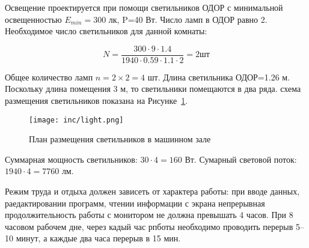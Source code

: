 Освещение проектируется при помощи светильников ОДОР с минимальной освещенностью $E_{min}=300$ лк, P=40 Вт. Число ламп в ОДОР равно 2. Необходимое число светильников для данной комнаты:

\begin{equation}
N = \frac{300 \cdot 9 \cdot 1.4}{1940 \cdot 0.59 \cdot 1.1 \cdot 2} = 2 \text{шт}
\end{equation}

Общее количество ламп $n = 2\times2=4$ шт. Длина светильника ОДОР=1.26 м. Поскольку длина помещения 3 м, то светильники помещаются в два ряда. схема размещения светильников показана на Рисунке~\ref{fig:light}.

\begin{figure}
\texttt{[image: inc/light.png]}
\caption{План размещения светильников в машинном зале}
\label{fig:light}
\end{figure}

Суммарная мощность светильников: $30\cdot4=160$ Вт. Сумарный световой поток: $1940\cdot4=7760$ лм.

Режим труда и отдыха должен зависеть от характера работы: при вводе данных, раедактировании программ, чтении информации с экрана непрерывная продолжительность работы с монитором не должна превышать 4 часов. При 8 часовом рабочем дне, через кадый час рпботы необходимо проводить перерыв 5--10 минут, а каждые два часа перерыв в 15 мин.
